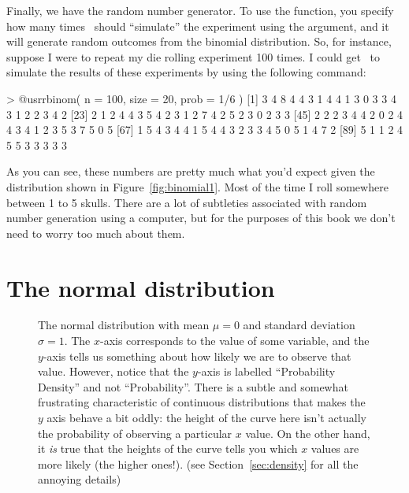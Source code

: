 Finally, we have the random number generator. To use the  function, you specify how many times \R\ should ``simulate'' the experiment using the  argument, and it will generate random outcomes from the binomial distribution. So, for instance, suppose I were to repeat my die rolling experiment 100 times. I could get \R\ to simulate the results of these experiments by using the following command:
\begin{rblock1}
> @usr{rbinom( n = 100, size = 20, prob = 1/6 )}
  [1] 3 4 8 4 4 3 1 4 4 1 3 0 3 3 4 3 1 2 2 3 4 2
 [23] 2 1 2 4 4 3 5 4 2 3 1 2 7 4 2 5 2 3 0 2 3 3
 [45] 2 2 2 3 4 4 2 0 2 4 4 3 4 1 2 3 5 3 7 5 0 5
 [67] 1 5 4 3 4 4 1 5 4 4 3 2 3 3 4 5 0 5 1 4 7 2
 [89] 5 1 1 2 4 5 5 3 3 3 3 3
\end{rblock1}
As you can see, these numbers are pretty much what you'd expect given the distribution shown in Figure~\ref{fig:binomial1}. Most of the time I roll somewhere between 1 to 5 skulls. There are a lot of subtleties associated with random number generation using a computer, but for the purposes of this book we don't need to worry too much about them.


\section{The normal distribution\label{sec:normal}}


\begin{figure}[t]
\begin{center}
\caption{The normal distribution with mean $\mu = 0$ and standard deviation $\sigma = 1$. The $x$-axis corresponds to the value of some variable, and the $y$-axis tells us something about how likely we are to observe that value. However, notice that the $y$-axis is labelled ``Probability Density'' and not ``Probability''. There is a subtle and somewhat frustrating characteristic of continuous distributions that makes the $y$ axis behave a bit oddly: the height of the curve here isn't actually the probability of observing a particular $x$ value. On the other hand, it {\it is} true that the heights of the curve tells you which $x$ values are more likely (the higher ones!). (see Section~\ref{sec:density} for all the annoying details)}
\HR
\label{fig:normdist}
\end{center}
\end{figure}



